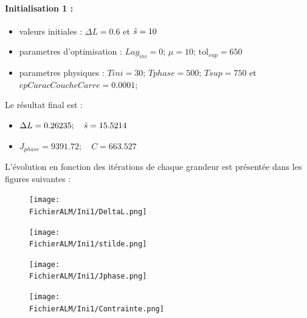 \documentclass[11pt,a4paper]{article}
\begin{document}
\paragraph{Initialisation 1 :}

\begin{itemize}
	\item valeurs initiales : $\Delta L=0.6$ et $\tilde{s}=10$
	\item parametres d'optimisation : $Lag_{ini}=0$; $\mu=10$; $\textrm{tol}_{sup}=650$
	\item parametres physiques : $Tini=30;\,Tphase=500;\,Tsup=750$ et $epCaracCoucheCarre=0.0001;$
\end{itemize}

Le résultat final est :
\begin{itemize}
	\item $\Delta L= 0.26235 ;\quad \tilde{s}=15.5214$
	\item $J_{phase}=9391.72;\quad C= 663.527$
\end{itemize}

L'évolution en fonction des itérations de chaque grandeur est présentée dans les figures suivantes :

\begin{figure}[H]
	\begin{minipage}{0.45\textwidth}
		\centering
		\texttt{[image: \\FichierALM/Ini1/DeltaL.png]}
	\end{minipage}
	\begin{minipage}{0.45\textwidth}
		\centering
		\texttt{[image: \\FichierALM/Ini1/stilde.png]}
	\end{minipage}	
\end{figure}

\begin{figure}[H]
	\begin{minipage}{0.45\textwidth}
		\centering
		\texttt{[image: \\FichierALM/Ini1/Jphase.png]}
	\end{minipage}
	\begin{minipage}{0.45\textwidth}
		\centering
		\texttt{[image: \\FichierALM/Ini1/Contrainte.png]}
	\end{minipage}	
\end{figure}

\setcounter{x}{0}
\end{document}
